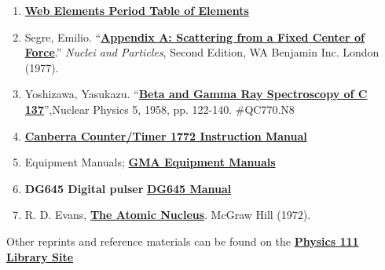 \documentclass{../lab}
\begin{document}
\begin{enumerate}
    \item \href{http://www.webelements.com}{\textbf{Web Elements Period Table of Elements}}

    \item Segre, Emilio. ``\href{http://physics111.lib.berkeley.edu/Physics111/Reprints/GMA/Scattering\%20From\%20Center\%20appendix\%20a.pdf}{\textbf{Appendix A: Scattering from a Fixed Center of Force}}.'' \emph{Nuclei and Particles}, Second Edition, WA Benjamin Inc. London (1977).
    
    \item Yoshizawa, Yasukazu. ``\href{http://physics111.lib.berkeley.edu/Physics111/Reprints/GMA/betaandgammarayspecofCs137.pdf}{\textbf{Beta and Gamma Ray Spectroscopy of C 137}}'',Nuclear Physics 5, 1958, pp. 122-140. \#QC770.N8
    
    \item \href{http://physics111.lib.berkeley.edu/Physics111/Reprints/GMA/Canberra\_counter\_1772.pdf}{\textbf{Canberra Counter/Timer 1772 Instruction Manual}}
    
    \item Equipment Manuals; \href{http://physics111.lib.berkeley.edu/Physics111/Equipment\_Manuals/GMA/indexequipGMA.html}{\textbf{GMA Equipment Manuals}}
    
    \item \textbf{DG645 Digital pulser} \href{http://www.thinksrs.com/downloads/PDFs/Manuals/DG645m.pdf}{\textbf{DG645 Manual}}
    
    \item R. D. Evans, \href{http://physics111.lib.berkeley.edu/Physics111/Reprints/R.D.Evans\%20Atomic\%20Nucleus/The\%20Atomic\%20Nucleus\%20Evans\%20full\%20text.pdf}{\textbf{The Atomic Nucleus}}. McGraw Hill (1972).
\end{enumerate}

\noindent Other reprints and reference materials can be found on the \href{http://physics111.lib.berkeley.edu/Physics111/Reprints/GMA/GMA\_index.html}{\textbf{Physics 111 Library Site}}
\end{document}
